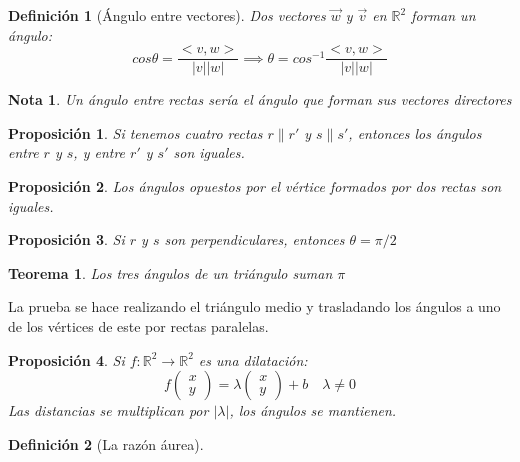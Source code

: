 \documentclass[11pt, a4paper, titlepage]{article}
\makeatletter
\renewenvironment{proof}[1][\proofname] {\vspace{-15pt}\par\pushQED{\qed}\normalfont\topsep6\p@\@plus6\p@\relax\trivlist\item[\hskip\labelsep\it#1\@addpunct{.}]\ignorespaces}{\popQED\endtrivlist\@endpefalse}
\newcommand{\R}{\mathbb{R}}
\renewcommand{\vec}{\overrightarrow}
\theoremstyle{theorem-style}
\newtheorem*{nth}{Teorema}
\newtheorem*{nprop}{Proposición}
\theoremstyle{definition-style}
\newtheorem*{ndef}{Definición}
\theoremstyle{remark-style}
\newtheorem*{nota}{Nota}
\theoremstyle{example-style}
\makeatother
\begin{document}
\begin{ndef}[Ángulo entre vectores]
  Dos vectores $\vec{w}$ y $\vec{v}$ en $\R^2$ forman un ángulo:
  \[
    cos \theta =  \frac{< v,w >}{|v||w|} \implies \theta = cos^{-1} \frac{< v,w >}{|v||w|}
  \]
\end{ndef}
\begin{nota}
  Un ángulo entre rectas sería el ángulo que forman sus vectores directores
\end{nota}
\begin{nprop}
  Si tenemos cuatro rectas $r \parallel r'$ y $s \parallel s'$, entonces los ángulos entre $r$ y $s$, y entre $r'$ y $s'$ son iguales.
\end{nprop}

\begin{nprop}
  Los ángulos opuestos por el vértice formados por dos rectas son iguales.
\end{nprop}

\begin{nprop}
  Si $r$ y $s$ son perpendiculares, entonces $\theta = \pi/2$
\end{nprop}

\begin{nth}
  Los tres ángulos de un triángulo suman $\pi$
\end{nth}
\begin{proof}
  La prueba se hace realizando el triángulo medio y trasladando los ángulos a uno de los vértices de este por rectas paralelas.
\end{proof}

\begin{nprop}
  Si $f:\R^2 \to \R^2$ es una dilatación:
  \[
    f \begin{pmatrix}
      x\\
      y 
    \end{pmatrix} = \lambda\begin{pmatrix}
      x\\
      y 
    \end{pmatrix} + b \quad \lambda \ne 0
  \]
  Las distancias se multiplican por $|\lambda|$, los ángulos se mantienen.
\end{nprop}

\begin{ndef}[La razón áurea]
  
\end{ndef}
\end{document}

